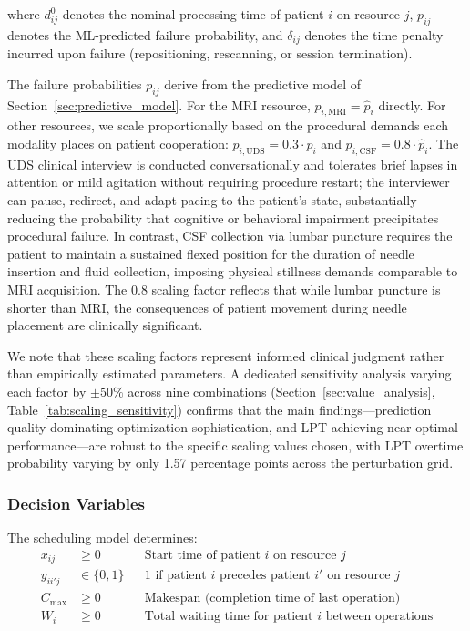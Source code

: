 \documentclass[11pt,a4paper]{article}
\begin{document}
where $d_{ij}^0$ denotes the nominal processing time of patient $i$ on resource $j$, $p_{ij}$ denotes the ML-predicted failure probability, and $\delta_{ij}$ denotes the time penalty incurred upon failure (repositioning, rescanning, or session termination).

The failure probabilities $p_{ij}$ derive from the predictive model of Section~\ref{sec:predictive_model}. For the MRI resource, $p_{i,\text{MRI}} = \hat{p}_i$ directly. For other resources, we scale proportionally based on the procedural demands each modality places on patient cooperation: $p_{i,\text{UDS}} = 0.3 \cdot \hat{p}_i$ and $p_{i,\text{CSF}} = 0.8 \cdot \hat{p}_i$. The UDS clinical interview is conducted conversationally and tolerates brief lapses in attention or mild agitation without requiring procedure restart; the interviewer can pause, redirect, and adapt pacing to the patient's state, substantially reducing the probability that cognitive or behavioral impairment precipitates procedural failure. In contrast, CSF collection via lumbar puncture requires the patient to maintain a sustained flexed position for the duration of needle insertion and fluid collection, imposing physical stillness demands comparable to MRI acquisition. The 0.8 scaling factor reflects that while lumbar puncture is shorter than MRI, the consequences of patient movement during needle placement are clinically significant.

We note that these scaling factors represent informed clinical judgment rather than empirically estimated parameters. A dedicated sensitivity analysis varying each factor by $\pm 50\%$ across nine combinations (Section~\ref{sec:value_analysis}, Table~\ref{tab:scaling_sensitivity}) confirms that the main findings---prediction quality dominating optimization sophistication, and LPT achieving near-optimal performance---are robust to the specific scaling values chosen, with LPT overtime probability varying by only 1.57 percentage points across the perturbation grid.

\subsubsection{Decision Variables}

The scheduling model determines:
\begin{align}
x_{ij} &\geq 0 && \text{Start time of patient } i \text{ on resource } j \\
y_{ii'j} &\in \{0, 1\} && \text{1 if patient } i \text{ precedes patient } i' \text{ on resource } j \\
C_{\max} &\geq 0 && \text{Makespan (completion time of last operation)} \\
W_i &\geq 0 && \text{Total waiting time for patient } i \text{ between operations}
\end{align}
\end{document}
